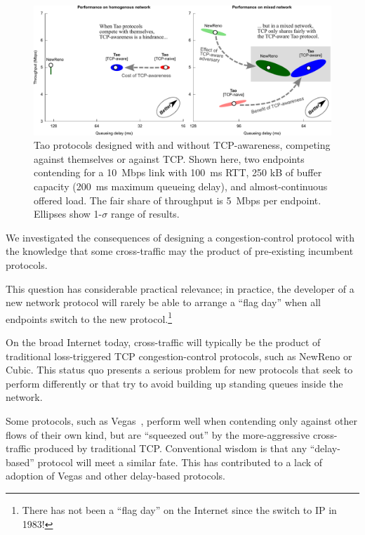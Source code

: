 \begin{figure}[b!]
%
\includegraphics[width=\textwidth]{figures/manual/compatibility-drawn.pdf}
\caption{Tao protocols designed with and without TCP-awareness,
  competing against themselves or against TCP. Shown here, two
  endpoints contending for a 10~Mbps link with 100~ms RTT, 250 kB of
  buffer capacity (200~ms maximum queueing delay), and
  almost-continuous offered load. The fair share of throughput is
  5~Mbps per endpoint. Ellipses show 1-$\sigma$ range of results.}
\label{fig:tcpaware}
\end{figure}

\label{s:tcpaware}

We investigated the consequences of designing a congestion-control
protocol with the knowledge that some cross-traffic may the product of
pre-existing incumbent protocols.

This question has considerable practical relevance; in practice, the
developer of a new network protocol will rarely be able to arrange a
``flag day'' when all endpoints switch to the new
protocol.\footnote{There has not been a ``flag day'' on the Internet
  since the switch to IP in 1983!}

On the broad Internet today, cross-traffic will typically be the
product of traditional loss-triggered TCP congestion-control
protocols, such as NewReno or Cubic. This status quo presents a
serious problem for new protocols that seek to perform differently or
that try to avoid building up standing queues inside the network.

Some protocols, such as Vegas~\cite{vegas}, perform well when
contending only against other flows of their own kind, but are
``squeezed out'' by the more-aggressive cross-traffic produced by
traditional TCP. Conventional wisdom is that any ``delay-based''
protocol will meet a similar fate. This has contributed to a lack of
adoption of Vegas and other delay-based protocols.

